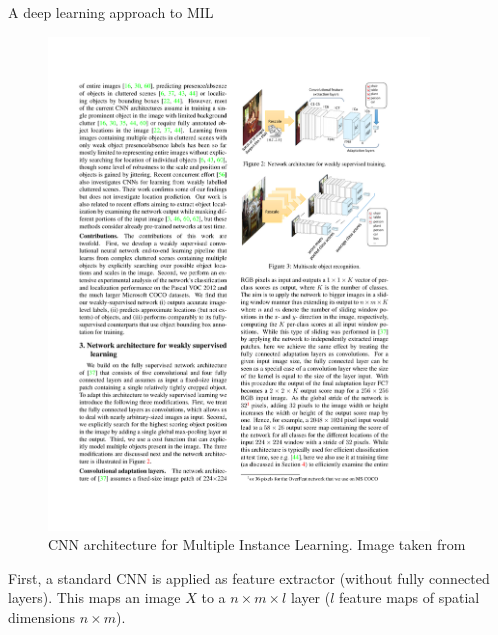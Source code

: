 \documentclass[xcolor=pdftex,dvipsnames,table]{beamer}
\begin{document}
\begin{frame}{A deep learning approach to MIL}
\begin{figure}[htb]
   \centering
   \includegraphics[width=0.9\textwidth]{../graphics/mil_deep_learning_v1.pdf}
   \caption{CNN architecture for Multiple Instance Learning. Image taken from \cite{Oquab2015}}
\end{figure}
First, a standard CNN is applied as feature extractor (without fully connected layers). This maps an image $X$ to a $n \times m \times l$ layer ($l$ feature maps of spatial dimensions $n \times m$). 
\end{frame}
\end{document}
